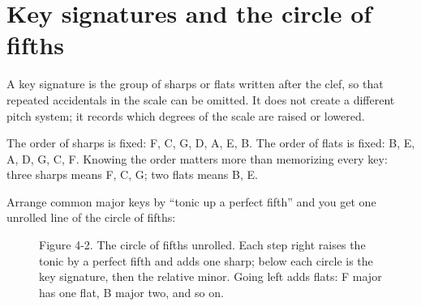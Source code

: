 \section{Key signatures and the circle of fifths}

A key signature is the group of sharps or flats written after the clef, so that repeated accidentals in the scale can be omitted. It does not create a different pitch system; it records which degrees of the scale are raised or lowered.

The order of sharps is fixed: F, C, G, D, A, E, B. The order of flats is fixed: B, E, A, D, G, C, F. Knowing the order matters more than memorizing every key: three sharps means F\sharpsym, C\sharpsym, G\sharpsym; two flats means B\flatsym, E\flatsym.

Arrange common major keys by ``tonic up a perfect fifth'' and you get one unrolled line of the circle of fifths:

\begin{figure}[htbp]
\centering
{}

\small Figure 4-2. The circle of fifths unrolled. Each step right raises the tonic by a perfect fifth and adds one sharp; below each circle is the key signature, then the relative minor. Going left adds flats: F major has one flat, B\flatsym{} major two, and so on.
\end{figure}

